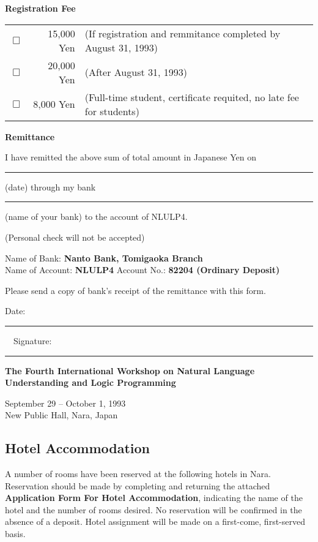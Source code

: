 {\bf Registration Fee}

\begin{tabular}{lrl}
$\Box$ & 15,000 Yen & (If registration and remmitance completed by August
31, 1993)\\
$\Box$ & 20,000 Yen & (After August 31, 1993)\\
$\Box$ & 8,000 Yen & (Full-time student, certificate requited, no late
fee for students)\\
\end{tabular}

{\bf Remittance}

I have remitted the above sum of total amount in Japanese Yen on
\rule[-1mm]{40mm}{.1mm}(date) through my bank
\rule[-1mm]{40mm}{.1mm}(name of your bank) to the account of NLULP4.

\hspace*{10mm}(Personal check will not be accepted)

Name of Bank: {\bf Nanto Bank, Tomigaoka Branch}\\
Name of Account: {\bf NLULP4}
\hspace{10mm} Account No.: {\bf 82204 (Ordinary Deposit)}

Please send a copy of bank's receipt of the remittance with this form.

\vspace{5mm}
Date: \rule[-1mm]{60mm}{.1mm}\ \  Signature: \rule[-1mm]{60mm}{.1mm}

\clearpage

\begin{center}
{\large\bf The Fourth International Workshop on Natural Language Understanding
and Logic Programming}

September 29 -- October 1, 1993\\
New Public Hall, Nara, Japan
\end{center}

\subsection*{Hotel Accommodation}

A number of rooms have been reserved at the following hotels in Nara.
Reservation should be made by completing and returning the attached
{\bf Application Form For Hotel Accommodation}, indicating the name of
the hotel and the number of rooms desired.  No reservation will be
confirmed in the absence of a deposit.  Hotel assignment will be made
on a first-come, first-served basis.

